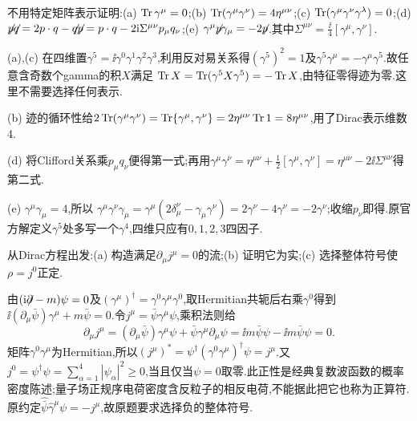 \begin{exercise}
不用特定矩阵表示证明:(a) $\Tr\gamma^\mu=0$;(b) $\Tr(\gamma^\mu\gamma^\nu)=4\eta^{\mu\nu}$;(c) $\Tr(\gamma^\mu\gamma^\nu\gamma^\lambda)=0$;(d) $\slashed p\slashed q=2p\cdot q-\slashed q\slashed p=p\cdot q-2\ii\Sigma^{\mu\nu}p_\mu q_\nu$;(e) $\gamma^\mu\slashed p\gamma_\mu=-2\slashed p$.其中$\Sigma^{\mu\nu}=\frac\ii4[\gamma^\mu,\gamma^\nu]$.
\end{exercise}
\begin{solution}
(a),(c) 在四维置$\gamma^5=\ii\gamma^0\gamma^1\gamma^2\gamma^3$,利用反对易关系得$(\gamma^5)^2=1$及$\gamma^5\gamma^\mu=-\gamma^\mu\gamma^5$.故任意含奇数个gamma的积$X$满足
$\Tr X=\Tr(\gamma^5X\gamma^5)=-\Tr X$,由特征零得迹为零.这里不需要选择任何表示.

(b) 迹的循环性给$2\Tr(\gamma^\mu\gamma^\nu)=\Tr\{\gamma^\mu,\gamma^\nu\}=2\eta^{\mu\nu}\Tr1=8\eta^{\mu\nu}$,用了Dirac表示维数4.

(d) 将Clifford关系乘$p_\mu q_\nu$便得第一式;再用$\gamma^\mu\gamma^\nu=\eta^{\mu\nu}+\frac12[\gamma^\mu,\gamma^\nu]=\eta^{\mu\nu}-2\ii\Sigma^{\mu\nu}$得第二式.

(e) $\gamma^\mu\gamma_\mu=4$,所以
$\gamma^\mu\gamma^\nu\gamma_\mu=\gamma^\mu(2\delta^\nu_\mu-\gamma_\mu\gamma^\nu)=2\gamma^\nu-4\gamma^\nu=-2\gamma^\nu$;收缩$p_\nu$即得.原官方解定义$\gamma^5$处多写一个$\gamma^4$,四维只应有$0,1,2,3$四因子.
\end{solution}

\begin{exercise}
从Dirac方程出发:(a) 构造满足$\partial_\mu j^\mu=0$的流;(b) 证明它为实;(c) 选择整体符号使$\rho=j^0$正定.
\end{exercise}
\begin{solution}
由$(\ii\slashed\partial-m)\psi=0$及$(\gamma^\mu)^\dagger=\gamma^0\gamma^\mu\gamma^0$,取Hermitian共轭后右乘$\gamma^0$得到
$\ii(\partial_\mu\bar\psi)\gamma^\mu+m\bar\psi=0$.令$j^\mu=\bar\psi\gamma^\mu\psi$,乘积法则给
\[
 \partial_\mu j^\mu=(\partial_\mu\bar\psi)\gamma^\mu\psi+\bar\psi\gamma^\mu\partial_\mu\psi
 =\ii m\bar\psi\psi-\ii m\bar\psi\psi=0.
\]
矩阵$\gamma^0\gamma^\mu$为Hermitian,所以$(j^\mu)^*=\psi^\dagger(\gamma^0\gamma^\mu)^\dagger\psi=j^\mu$.又$j^0=\psi^\dagger\psi=\sum_{\alpha=1}^4|\psi_\alpha|^2\geq0$,当且仅当$\psi=0$取零.此正性是经典复数波函数的概率密度陈述;量子场正规序电荷密度含反粒子的相反电荷,不能据此把它也称为正算符.原约定$\widehat{\bar\psi}\widehat\gamma^\mu\psi=-j^\mu$,故原题要求选择负的整体符号.
\end{solution}
